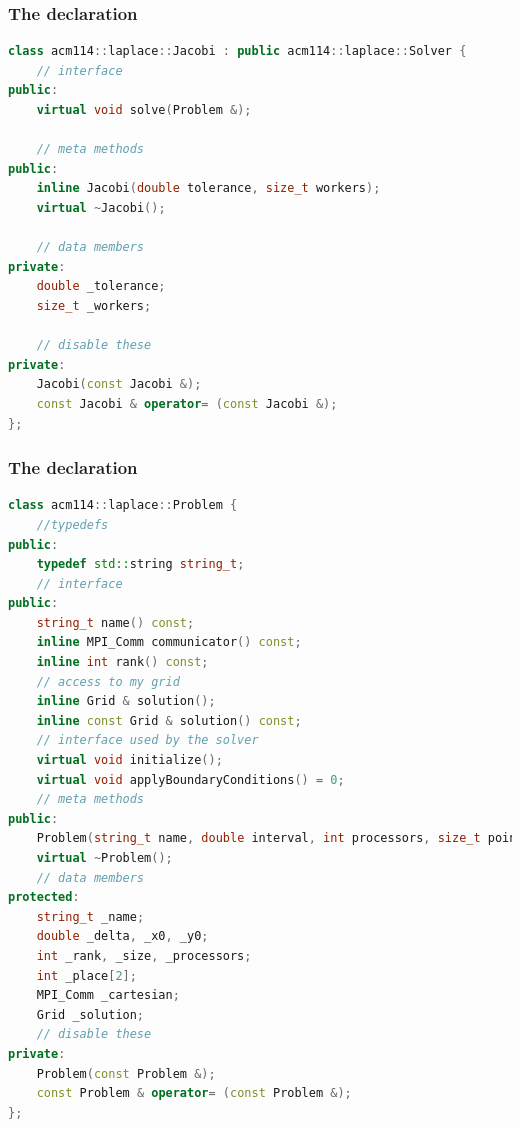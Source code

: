 \begin{frame}[fragile]
%
  \frametitle{The  declaration}
%
  \begin{lstlisting}[language=c++,name=mpi:jacobi-decl,basicstyle=\tt\bfseries\tiny]
class acm114::laplace::Jacobi : public acm114::laplace::Solver {
    // interface
public:
    virtual void solve(Problem &);

    // meta methods
public:
    inline Jacobi(double tolerance, size_t workers);
    virtual ~Jacobi();

    // data members
private:
    double _tolerance;
    size_t _workers;

    // disable these
private:
    Jacobi(const Jacobi &);
    const Jacobi & operator= (const Jacobi &);
};
  \end{lstlisting}
% 
\end{frame}

\begin{frame}[fragile]
%
  \frametitle{The  declaration}
%
  \begin{lstlisting}[language=c++,name=mpi:problem-decl,basicstyle=\tt\bfseries\tiny]
class acm114::laplace::Problem {
    //typedefs
public:
    typedef std::string string_t;
    // interface
public:
    string_t name() const;
    inline MPI_Comm communicator() const;
    inline int rank() const;
    // access to my grid
    inline Grid & solution();
    inline const Grid & solution() const;
    // interface used by the solver
    virtual void initialize();
    virtual void applyBoundaryConditions() = 0;
    // meta methods
public:
    Problem(string_t name, double interval, int processors, size_t points);
    virtual ~Problem();
    // data members
protected:
    string_t _name;
    double _delta, _x0, _y0;
    int _rank, _size, _processors;
    int _place[2];
    MPI_Comm _cartesian;
    Grid _solution;
    // disable these
private:
    Problem(const Problem &);
    const Problem & operator= (const Problem &);
};
  \end{lstlisting}
% 
\end{frame}

